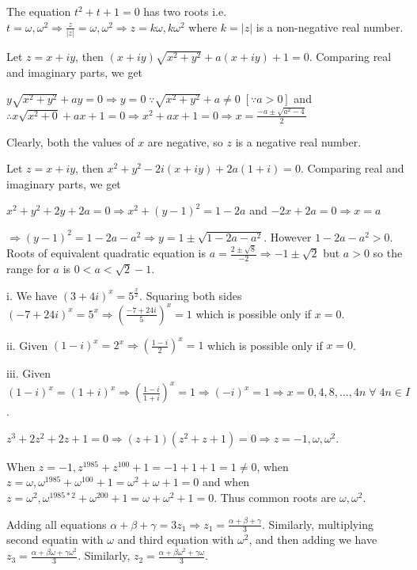   The equation $t^2 + t + 1 = 0$ has two roots i.e. $t = \omega, \omega^2 \Rightarrow \frac{z}{|z|} =
  \omega, \omega^2\Rightarrow z = k\omega, k\omega^2$ where $k = |z|$ is a non-negative real number.
\item Let $z = x + iy$, then $(x + iy)\sqrt{x^2 + y^2} + a(x + iy) + 1 = 0$.
  Comparing real and imaginary parts, we get

  $y\sqrt{x^2 + y^2} + ay = 0 \Rightarrow y = 0\;\because \sqrt{x^2 + y^2} + a \neq 0\;[\because a > 0]$ and
  $\therefore x\sqrt{x^2 + 0} + ax + 1 = 0 \Rightarrow x^2 + ax + 1 = 0 \Rightarrow x = \frac{-a
    \pm\sqrt{a^2 - 4}}{2}$

  Clearly, both the values of $x$ are negative, so $z$ is a negative real number.
\item Let $z = x + iy$, then $x^2 + y^2 - 2i(x + iy) + 2a(1 + i) = 0$.
  Comparing real and imaginary parts, we get

  $x^2 + y^2 + 2y + 2a = 0 \Rightarrow x^2 + (y - 1)^2 = 1 - 2a$ and $-2x + 2a = 0 \Rightarrow x = a$

  $\Rightarrow (y - 1)^2 = 1 - 2a - a^2 \Rightarrow y = 1 \pm \sqrt{1 - 2a - a^2}$.
  However $1 - 2a - a^2 > 0$. Roots of equivalent quadratic equation is $a = \frac{2 \pm \sqrt{8}}{-2}
  \Rightarrow -1\pm \sqrt{2}$ but $a > 0$ so the range for $a$ is $0 < a < \sqrt{2} - 1$.
\item i. We have $(3 + 4i)^x = 5^{\frac{x}{2}}$. Squaring both sides $(-7 + 24i)^x = 5^x \Rightarrow
  \left(\frac{-7 + 24i}{5}\right)^x = 1$ which is possible only if $x = 0$.

  ii. Given $(1 - i)^x = 2^x \Rightarrow \left(\frac{1 - i}{2}\right)^x  = 1$ which is possible only if $x =
  0$.

  iii. Given $(1 - i)^x = (1 + i)^x \Rightarrow \left(\frac{1 - i}{1 + i}\right)^x = 1 \Rightarrow (-i)^x =
  1 \Rightarrow x = 0, 4, 8, \ldots, 4n\;\forall\;4n\in I$.
\item $z^3 + 2z^2 + 2z + 1 = 0\Rightarrow (z + 1)(z^2 + z + 1) = 0 \Rightarrow z = -1, \omega, \omega^2$.

  When $z = -1, z^{1985} + z^{100} + 1 = -1 + 1 + 1 = 1 \neq 0$, when $z = \omega, \omega^{1985} +
  \omega^{100} + 1 = \omega^2 + \omega + 1 = 0$ and when $z = \omega^2, \omega^{1985*2} + \omega^{200} + 1 =
  \omega + \omega^2 + 1 = 0$. Thus common roots are $\omega, \omega^2$.
\item Adding all equations $\alpha + \beta + \gamma = 3z_1 \Rightarrow z_1 = \frac{\alpha + \beta +
  \gamma}{3}$. Similarly, multiplying second equatin with $\omega$ and third equation with $\omega^2$, and
  then adding we have $z_3 = \frac{\alpha + \beta\omega + \gamma\omega^2}{3}$. Similarly, $z_2 =
  \frac{\alpha + \beta\omega^2 + \gamma\omega}{3}$.

